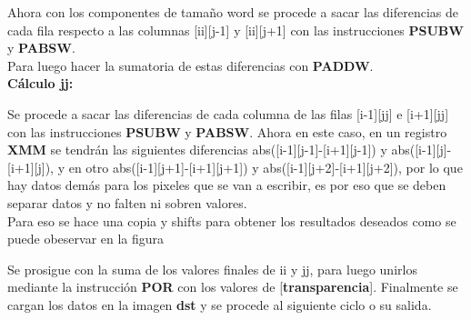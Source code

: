 Ahora con los componentes de tamaño word se procede a sacar las diferencias de cada fila respecto a las columnas [ii][j-1] y [ii][j+1] con las instrucciones \textbf{PSUBW} y \textbf{PABSW}. \\
Para luego hacer la sumatoria de estas diferencias con \textbf{PADDW}. \\

{\centering\textbf{Cálculo jj:}}

Se procede a sacar las diferencias de cada columna de las filas [i-1][jj] e [i+1][jj] con las instrucciones \textbf{PSUBW} y \textbf{PABSW}.
Ahora en este caso, en un registro \textbf{XMM} se tendrán las siguientes diferencias  abs([i-1][j-1]-[i+1][j-1]) y abs([i-1][j]-[i+1][j]), y en otro  abs([i-1][j+1]-[i+1][j+1]) y abs([i-1][j+2]-[i+1][j+2]), por lo que hay datos demás para los pixeles que se van a escribir, es por eso que se deben separar datos y no falten ni sobren valores. \\ Para eso se hace una copia y shifts para obtener los resultados deseados como se puede obeservar en la figura%

Se prosigue con la suma de los valores finales de ii y jj, para luego unirlos mediante la instrucción \textbf{POR} con los valores de [\textbf{transparencia}]. Finalmente se cargan los datos en la imagen \textbf{dst} y se procede al siguiente ciclo o su salida.

